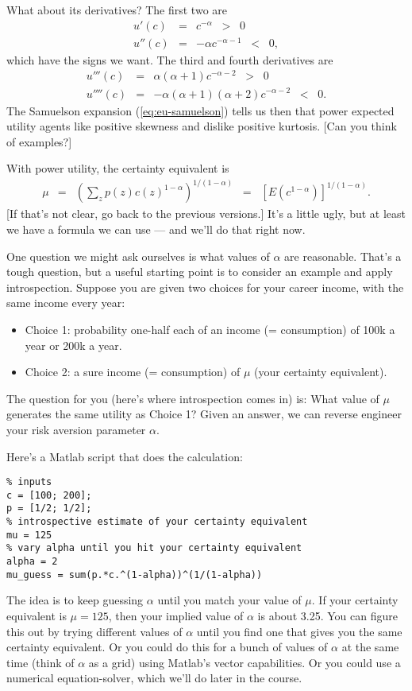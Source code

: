 \documentclass[11pt]{article}
\begin{document}
What about its derivatives?
The first two are
\begin{eqnarray*}
    u'(c)  &=& c^{-\alpha} \;\;>\;\; 0 \\
    u''(c) &=& -\alpha c^{-\alpha-1} \;\;<\;\; 0 ,
\end{eqnarray*}
which have the signs we want.
The third and fourth derivatives are
\begin{eqnarray*}
    u'''(c)  &=& \alpha (\alpha+1) c^{-\alpha-2} \;\;>\;\; 0 \\
    u''''(c) &=& - \alpha (\alpha+1) (\alpha+2) c^{-\alpha-2} \;\;<\;\; 0 .
\end{eqnarray*}
The Samuelson expansion (\ref{eq:eu-samuelson}) tells us then that
power expected utility agents like positive skewness
and dislike positive kurtosis.
[Can you think of examples?]

With power utility,
the certainty equivalent is
\begin{eqnarray}
    \mu &=& \left( \sum_z p(z) c(z)^{1-\alpha} \right)^{1/(1-\alpha)}
        \;\;=\;\; \left[ E (c^{1-\alpha}) \right]^{1/(1-\alpha)} .
    \label{eq:certainty-equivalent-power}
\end{eqnarray}
[If that's not clear, go back to the previous versions.]
It's a little ugly, but at least we have a formula we can use ---
and we'll do that right now.


One question we might ask ourselves is what values of $\alpha$ are reasonable.
That's a tough question,
but a useful starting point is to consider an example and apply introspection.
Suppose you are given two choices for your career income, with the same
income every year:
\begin{itemize}
\item Choice 1:  probability one-half each of an income (= consumption)
of 100k a year or 200k a year.
\item Choice 2:  a sure income (= consumption) of $\mu$ (your certainty equivalent).
\end{itemize}
The question for you (here's where introspection comes in) is:
What value of $\mu$ generates the same utility as Choice 1?
Given an answer, we can reverse engineer your risk aversion
parameter $\alpha$.

Here's a Matlab script that does the calculation:
\begin{verbatim}
% inputs
c = [100; 200];
p = [1/2; 1/2];
% introspective estimate of your certainty equivalent
mu = 125
% vary alpha until you hit your certainty equivalent
alpha = 2
mu_guess = sum(p.*c.^(1-alpha))^(1/(1-alpha))
\end{verbatim}
The idea is to keep guessing $\alpha$ until you match your value of $\mu$.
If your certainty equivalent is $\mu = 125$, then
your implied value of $\alpha$ is about 3.25.
You can figure this out by trying different values of $\alpha$
until you find one that gives you the same certainty equivalent.
Or you could do this for a bunch of values of $\alpha$ at the same time
(think of $\alpha$ as a grid)
using Matlab's vector capabilities.
Or you could use a numerical equation-solver,
which we'll do later in the course.
\end{document}
